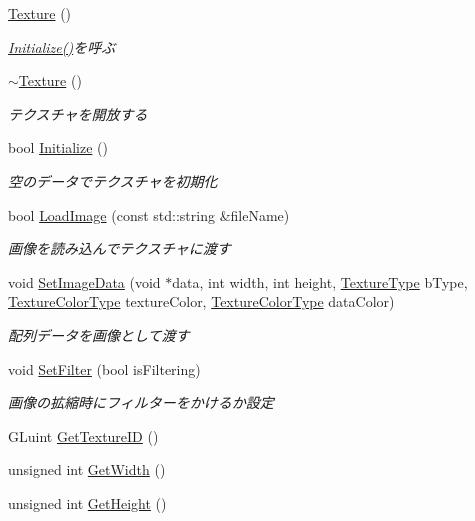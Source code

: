 \begin{DoxyCompactItemize}
\item 
\mbox{\hyperlink{class_k___graphics_1_1_texture_a3d4fc11068626d4d981b37d1d5aead47}{Texture}} ()
\begin{DoxyCompactList}\small\item\em \mbox{\hyperlink{class_k___graphics_1_1_texture_a569217a622e060f157842e5d492b8b34}{Initialize()}}を呼ぶ \end{DoxyCompactList}\item 
\mbox{\hyperlink{class_k___graphics_1_1_texture_aacbb913221bc16ca6b1b2d8f8a62fc60}{$\sim$\+Texture}} ()
\begin{DoxyCompactList}\small\item\em テクスチャを開放する \end{DoxyCompactList}\item 
bool \mbox{\hyperlink{class_k___graphics_1_1_texture_a569217a622e060f157842e5d492b8b34}{Initialize}} ()
\begin{DoxyCompactList}\small\item\em 空のデータでテクスチャを初期化 \end{DoxyCompactList}\item 
bool \mbox{\hyperlink{class_k___graphics_1_1_texture_a3f4839ab22e8a2e9aeb58ae49509f73d}{Load\+Image}} (const std\+::string \&file\+Name)
\begin{DoxyCompactList}\small\item\em 画像を読み込んでテクスチャに渡す \end{DoxyCompactList}\item 
void \mbox{\hyperlink{class_k___graphics_1_1_texture_a07e94ca2f5d93698ad168ac15e3cc2dd}{Set\+Image\+Data}} (void $\ast$data, int width, int height, \mbox{\hyperlink{namespace_k___graphics_a218722f1def83362c6b74680b8c1c529}{Texture\+Type}} b\+Type, \mbox{\hyperlink{namespace_k___graphics_a9654dafb2cd6eaed24a292a6f8373955}{Texture\+Color\+Type}} texture\+Color, \mbox{\hyperlink{namespace_k___graphics_a9654dafb2cd6eaed24a292a6f8373955}{Texture\+Color\+Type}} data\+Color)
\begin{DoxyCompactList}\small\item\em 配列データを画像として渡す \end{DoxyCompactList}\item 
void \mbox{\hyperlink{class_k___graphics_1_1_texture_ada11b0ac5f51e73ca07dc2a69fb32e3c}{Set\+Filter}} (bool is\+Filtering)
\begin{DoxyCompactList}\small\item\em 画像の拡縮時にフィルターをかけるか設定 \end{DoxyCompactList}\item 
G\+Luint \mbox{\hyperlink{class_k___graphics_1_1_texture_ab37df6d52bfb67f14065f1d8f26c3472}{Get\+Texture\+ID}} ()
\item 
unsigned int \mbox{\hyperlink{class_k___graphics_1_1_texture_ad5085a98a35f04eaf532e2a2acdf672d}{Get\+Width}} ()
\item 
unsigned int \mbox{\hyperlink{class_k___graphics_1_1_texture_a6e7ba63d4782a62b055474945578fae9}{Get\+Height}} ()
\end{DoxyCompactItemize}


